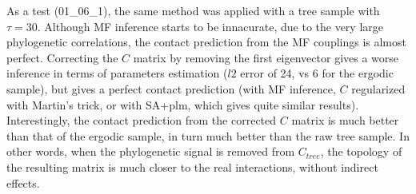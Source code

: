\documentclass[10pt]{article}
\begin{document}
As a test (01_06_1), the same method was applied with a tree sample with $\tau=30$. Although MF inference starts to be innacurate, due to the very large phylogenetic correlations, the contact prediction from the MF couplings is almost perfect. Correcting the $C$ matrix by removing the first eigenvector gives a worse inference in terms of parameters estimation ($l2$ error of 24, vs 6 for the ergodic sample), but gives a perfect contact prediction (with MF inference, $C$ regularized with Martin's trick, or with SA+plm, which gives quite similar results). \\
Interestingly, the contact prediction from the corrected $C$ matrix is much better than that of the ergodic sample, in turn much better than the raw tree sample. In other words, when the phylogenetic signal is removed from $C_{tree}$, the topology of the resulting matrix is much closer to the real interactions, without indirect effects. 



	
\end{document}
